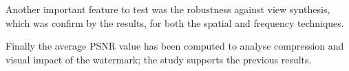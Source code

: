 \begin{table}[htbp]
 
 \begin{center}
 \caption{\label{tab:03}}
 \end{center}
 \end{table}
 
 \begin{table}[htbp]
 \begin{center}
 \caption{\label{tab:06}}
 \end{center}
 \end{table}

Another important feature to test was the robustness against view synthesis, which was confirm by the results, for both the spatial and frequency techniques.



Finally the average PSNR value has been computed to analyse compression and visual impact of the watermark; the study supports the previous results. 



